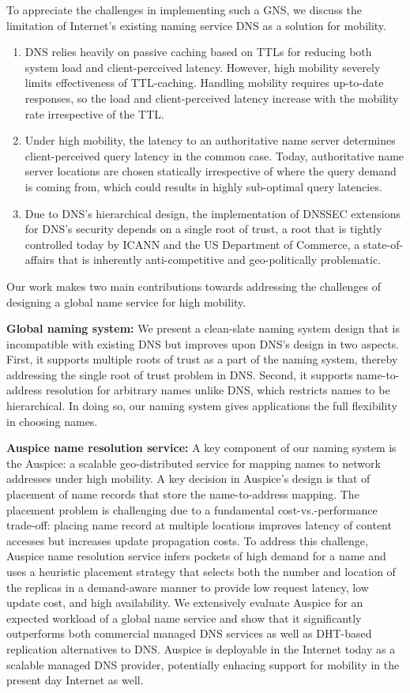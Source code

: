 To appreciate the challenges in implementing such a GNS, we discuss the limitation of Internet's existing naming service DNS as a solution for mobility.
\begin{enumerate}
	\item DNS relies heavily on passive caching based on TTLs for reducing both system load and client-perceived latency. However, high mobility severely limits effectiveness of TTL-caching. Handling mobility requires up-to-date responses, so the load and client-perceived latency increase with the mobility rate irrespective of the TTL.
	\item Under high mobility, the latency to an authoritative name server determines client-perceived query latency in the common case. Today, authoritative name server locations are chosen statically irrespective of where the query demand is coming from, which could results in highly sub-optimal query latencies. 
	\item Due to DNS's hierarchical design, the implementation of DNSSEC extensions for DNS's security depends on a single root of trust, a root that is tightly controlled today by ICANN and the US Department of Commerce, a state-of-affairs that is inherently anti-competitive and geo-politically problematic. 
\end{enumerate}



Our work makes two main contributions towards addressing the challenges of designing a global name service for high mobility. 

\textbf{Global naming system:} We present a clean-slate naming system design that is incompatible with existing DNS but improves upon DNS's design in two aspects. First, it supports multiple roots of trust as a part of the naming system, thereby addressing the single root of trust problem in DNS. Second, it supports name-to-address resolution for arbitrary names unlike DNS, which restricts names to be hierarchical. In doing so, our naming system gives applications the full flexibility in choosing names. 

\textbf{Auspice name resolution service:} A key component of our naming system is the Auspice: a scalable geo-distributed service for mapping names to network addresses under high mobility. A key decision in Auspice's design is that of placement of name records that store the name-to-address mapping. The placement problem is challenging due to a fundamental cost-vs.-performance trade-off: placing name record at multiple locations improves latency of content accesses but increases update propagation costs. To address this challenge, Auspice name resolution service infers pockets of high demand for a name and uses a heuristic placement strategy that selects both the number and location of the replicas in a demand-aware manner to provide low request latency, low update cost, and high availability.  We extensively evaluate Auspice for an expected workload of a global name service and show that it significantly outperforms both commercial managed DNS services as well as DHT-based replication alternatives to DNS. Auspice is deployable in the Internet today as a scalable managed DNS provider, potentially enhacing support for mobility in the present day Internet as well.

